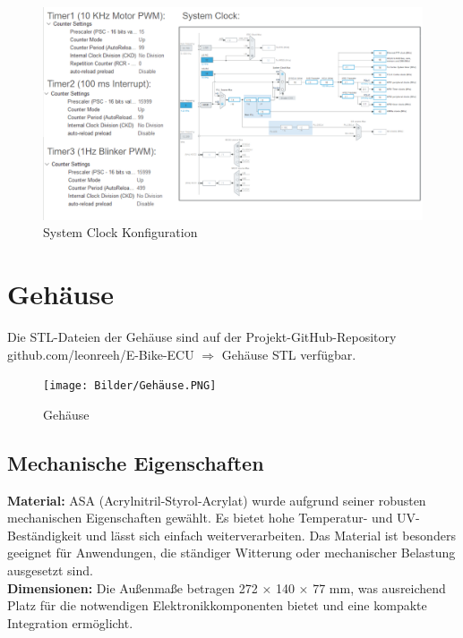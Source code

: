 \documentclass[paper=a4,11pt]{scrreprt}
\begin{document}
\begin{figure}[ht]
\begin{center}
\includegraphics[angle=90,width=14cm]{Bilder/Timer.PNG}
\caption{System Clock Konfiguration}
\label{clock}
\end{center}
\end{figure}


\chapter{Gehäuse}
Die STL-Dateien der Gehäuse sind auf der Projekt-GitHub-Repository
github.com/leonreeh/E-Bike-ECU $\Rightarrow$ Gehäuse STL verfügbar. 
\begin{figure}[ht]
\begin{center}
\texttt{[image: Bilder/Gehäuse.PNG]}
\caption{Gehäuse}
\label{Gehäuse}
\end{center}
\end{figure}
\section{Mechanische Eigenschaften}
\textbf{Material:} ASA (Acrylnitril-Styrol-Acrylat) wurde aufgrund seiner robusten mechanischen Eigenschaften gewählt. Es bietet hohe Temperatur- und UV-Beständigkeit und lässt sich einfach weiterverarbeiten. Das Material ist besonders geeignet für Anwendungen, die ständiger Witterung oder mechanischer Belastung ausgesetzt sind.\\
\textbf{Dimensionen:} Die Außenmaße betragen 272 × 140 × 77 mm, was ausreichend Platz für die notwendigen Elektronikkomponenten bietet und eine kompakte Integration ermöglicht.
\newpage
\end{document}

